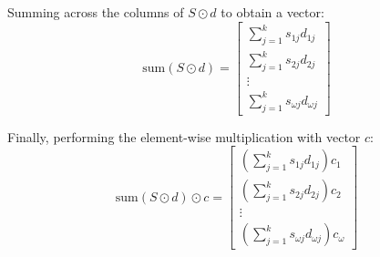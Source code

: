 \documentclass{article}
\begin{document}
Summing across the columns of $S \odot d$ to obtain a vector:
\[ \text{sum}(S \odot d) = \begin{bmatrix}
\sum_{j=1}^{k} s_{1j}d_{1j} \\
\sum_{j=1}^{k} s_{2j}d_{2j} \\
\vdots \\
\sum_{j=1}^{k} s_{\omega j}d_{\omega j}
\end{bmatrix} \]

Finally, performing the element-wise multiplication with vector $c$:
\[ \text{sum}(S \odot d) \odot c = \begin{bmatrix}
\left( \sum_{j=1}^{k} s_{1j}d_{1j} \right) c_1 \\
\left( \sum_{j=1}^{k} s_{2j}d_{2j} \right) c_2 \\
\vdots \\
\left( \sum_{j=1}^{k} s_{\omega j}d_{\omega j} \right) c_\omega
\end{bmatrix} \]
\end{document}
